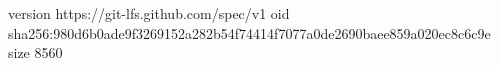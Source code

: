 version https://git-lfs.github.com/spec/v1
oid sha256:980d6b0ade9f3269152a282b54f74414f7077a0de2690baee859a020ec8c6c9e
size 8560
